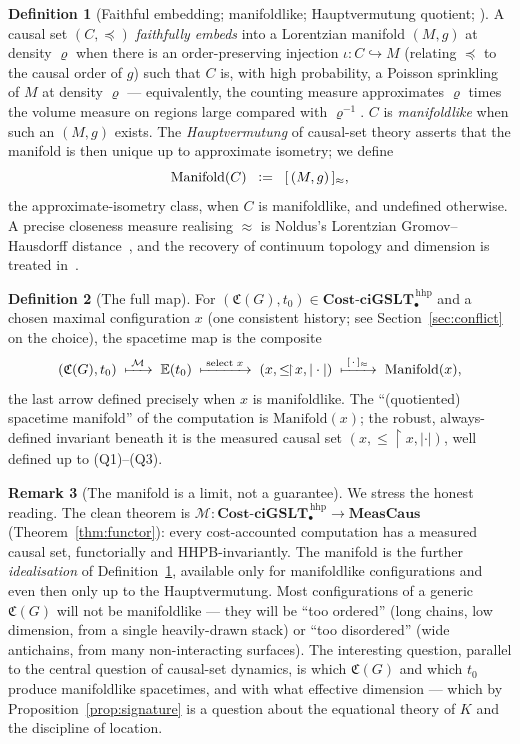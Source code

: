 \documentclass[11pt]{article}
\theoremstyle{definition}
\newtheorem{definition}{Definition}[section]
\newtheorem{remark}[definition]{Remark}
\theoremstyle{plain}
\newcommand{\ciGSLT}{\mathbf{ciGSLT}}
\newcommand{\CostCp}{\mathbf{Cost}\text{-}\ciGSLT_{\bullet}}
\newcommand{\Cost}{\mathfrak{C}}
\newcommand{\Ev}{\mathbb{E}}
\newcommand{\MeasCaus}{\mathbf{MeasCaus}}
\newcommand{\Map}{\mathcal{M}}
\newcommand{\restrict}{\!\restriction\!}
\newcommand{\defeq}{\;\mathrel{\vcentcolon=}\;}
\theoremstyle{remark}
\begin{document}
\begin{definition}[Faithful embedding; manifoldlike; Hauptvermutung quotient; {\cite{BLMS,BombelliNoldus,MajorRideoutSurya}}]
\label{def:manifold}
A causal set $(C,\preceq)$ \emph{faithfully embeds} into a Lorentzian
manifold $(M,g)$ at density $\varrho$ when there is an order-preserving
injection $\iota : C \hookrightarrow M$ (relating $\preceq$ to the causal
order of $g$) such that $C$ is, with high probability, a Poisson
sprinkling of $M$ at density $\varrho$ --- equivalently, the counting
measure approximates $\varrho$ times the volume measure on regions large
compared with $\varrho^{-1}$. $C$ is \emph{manifoldlike} when such an
$(M,g)$ exists. The \emph{Hauptvermutung} of causal-set theory asserts
that the manifold is then unique up to approximate isometry; we define
\[
  \mathrm{Manifold}(C) \;\defeq\; [\,(M,g)\,]_{\approx},
\]
the approximate-isometry class, when $C$ is manifoldlike, and undefined
otherwise. A precise closeness measure realising $\approx$ is Noldus's
Lorentzian Gromov--Hausdorff distance~\cite{BombelliNoldus}, and the
recovery of continuum topology and dimension is treated
in~\cite{MajorRideoutSurya,MeyerThesis,Myrheim}.
\end{definition}

\begin{definition}[The full map]
\label{def:fullmap}
For $(\Cost(G), t_0) \in \CostCp^{\,\mathrm{hhp}}$ and a chosen maximal
configuration $x$ (one consistent history; see
Section~\ref{sec:conflict} on the choice), the spacetime map is the
composite
\[
  (\Cost(G), t_0)
  \;\xmapsto{\;\Map\;}\;
  \Ev(t_0)
  \;\xmapsto{\;\text{select } x\;}\;
  (x, \le\restrict x, |\cdot|)
  \;\xmapsto{\;[\,\cdot\,]_{\approx}\;}\;
  \mathrm{Manifold}(x),
\]
the last arrow defined precisely when $x$ is manifoldlike. The
``(quotiented) spacetime manifold'' of the computation is
$\mathrm{Manifold}(x)$; the robust, always-defined invariant beneath it
is the measured causal set $(x,\le\restrict x,|\cdot|)$, well defined up
to \textup{(Q1)--(Q3)}.
\end{definition}

\begin{remark}[The manifold is a limit, not a guarantee]
We stress the honest reading. The clean theorem is
$\Map : \CostCp^{\,\mathrm{hhp}} \to \MeasCaus$
(Theorem~\ref{thm:functor}): every cost-accounted computation has a
measured causal set, functorially and HHPB-invariantly. The manifold is
the further \emph{idealisation} of Definition~\ref{def:manifold},
available only for manifoldlike configurations and even then only up to
the Hauptvermutung. Most configurations of a generic $\Cost(G)$ will not
be manifoldlike --- they will be ``too ordered'' (long chains, low
dimension, from a single heavily-drawn stack) or ``too disordered''
(wide antichains, from many non-interacting surfaces). The interesting
question, parallel to the central question of causal-set dynamics, is
which $\Cost(G)$ and which $t_0$ produce manifoldlike spacetimes, and
with what effective dimension --- which by Proposition~\ref{prop:signature}
is a question about the equational theory of $K$ and the discipline of
location.
\end{remark}
\end{document}
